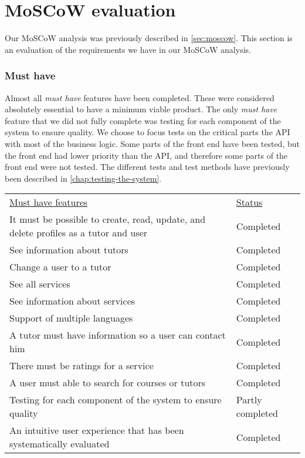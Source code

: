 \section{MoSCoW evaluation}
Our MoSCoW analysis was previously described in \autoref{sec:moscow}.
This section is an evaluation of the requirements we have in our MoSCoW analysis.

\subsubsection{Must have}
Almost all \textit{must have} features have been completed.
These were considered absolutely essential to have a minimum viable product. 
The only \textit{must have} feature that we did not fully complete was testing for each component of the system to ensure quality.
We choose to focus tests on the critical parts the API with most of the business logic. 
Some parts of the front end have been tested, but the front end had lower priority than the API, and therefore some parts of the front end were not tested. 
The different tests and test methods have previously been described in \autoref{chap:testing-the-system}.
\begin{table}[H]
    \begin{tabularx}{\textwidth}{|X|l|}
    \underline{Must have features}                                                                   & \underline{Status} \\
    It must be possible to create, read, update, and delete profiles as a tutor and user              & Completed \\
    See information about tutors                                                                      & Completed \\
    Change a user to a tutor                                                                          & Completed \\
    See all services                                                                                  & Completed \\
    See information about services                                                                    & Completed \\
    Support of multiple languages                                                                     & Completed \\
    A tutor must have information so a user can contact him                                           & Completed \\
    There must be ratings for a service                                                                 & Completed \\
    A user must able to search for courses or tutors                                                  & Completed \\
    Testing for each component of the system to ensure quality                                        & Partly completed \\
    An intuitive user experience that has been systematically evaluated                               & Completed \\
    \end{tabularx}
\end{table}

